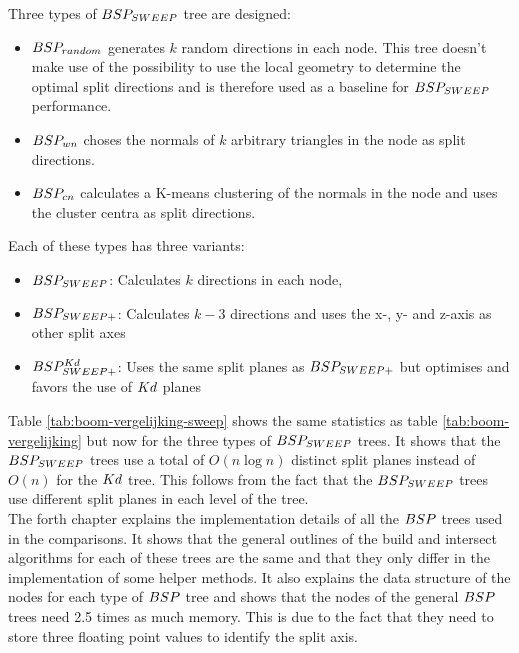 Three types of $BSP_{SWEEP}$ tree are designed:
\begin{itemize}
  \item $BSP_{random}$ generates $k$ random directions in each node. This tree doesn't make use of the possibility to use the local geometry to determine the optimal split directions and is therefore used as a baseline for $BSP_{SWEEP}$ performance.
  \item $BSP_{wn}$ choses the normals of $k$ arbitrary triangles in the node as split directions.
  \item $BSP_{cn}$ calculates a K-means clustering of the normals in the node and uses the cluster centra as split directions.
\end{itemize}

Each of these types has three variants:
\begin{itemize}
  \item $BSP_{SWEEP}$: Calculates $k$ directions in each node,
  \item $BSP_{SWEEP+}$: Calculates $k-3$ directions and uses the x-, y- and z-axis as other split axes
  \item $BSP^{Kd}_{SWEEP+}$: Uses the same split planes as $BSP_{SWEEP+}$ but optimises and favors the use of $Kd$ planes 
\end{itemize}

Table \ref{tab:boom-vergelijking-sweep} shows the same statistics as table \ref{tab:boom-vergelijking} but now for the three types of $BSP_{SWEEP}$ trees. It shows that the $BSP_{SWEEP}$ trees use a total of $O(n\log n)$ distinct split planes instead of $O(n)$ for the $Kd$ tree. This follows from the fact that the $BSP_{SWEEP}$ trees use different split planes in each level of the tree.\\

The forth chapter explains the implementation details of all the $BSP$ trees used in the comparisons.
It shows that the general outlines of the build and intersect algorithms for each of these trees are the same and that they only differ in the implementation of some helper methods.
It also explains the data structure of the nodes for each type of $BSP$ tree and shows that the nodes of the general $BSP$ trees need 2.5 times as much memory. This is due to the fact that they need to store three floating point values to identify the split axis.\\

